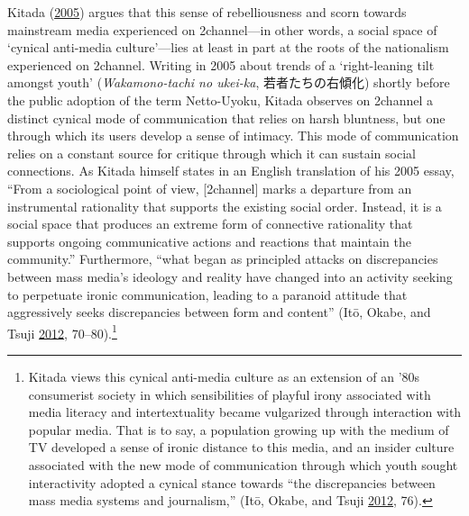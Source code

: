 \documentclass[10pt,british,A4paper,twoside]{memoir}
\begin{document}
Kitada (\protect\hyperlink{ref-kitada_eng:_2005}{2005}) argues that this
sense of rebelliousness and scorn towards mainstream media experienced
on 2channel---in other words, a social space of `cynical anti-media
culture'---lies at least in part at the roots of the nationalism
experienced on 2channel. Writing in 2005 about trends of a
`right-leaning tilt amongst youth' (\emph{Wakamono-tachi no ukei-ka},
若者たちの右傾化) shortly before the public adoption of the term
Netto-Uyoku, Kitada observes on 2channel a distinct cynical mode of
communication that relies on harsh bluntness, but one through which its
users develop a sense of intimacy. This mode of communication relies on
a constant source for critique through which it can sustain social
connections. As Kitada himself states in an English translation of his
2005 essay, ``From a sociological point of view, {[}2channel{]} marks a
departure from an instrumental rationality that supports the existing
social order. Instead, it is a social space that produces an extreme
form of connective rationality that supports ongoing communicative
actions and reactions that maintain the community.'' Furthermore, ``what
began as principled attacks on discrepancies between mass media's
ideology and reality have changed into an activity seeking to perpetuate
ironic communication, leading to a paranoid attitude that aggressively
seeks discrepancies between form and content'' (Itō, Okabe, and Tsuji
\protect\hyperlink{ref-ito_fandom_2012}{2012}, 70--80).\footnote{Kitada
  views this cynical anti-media culture as an extension of an '80s
  consumerist society in which sensibilities of playful irony associated
  with media literacy and intertextuality became vulgarized through
  interaction with popular media. That is to say, a population growing
  up with the medium of TV developed a sense of ironic distance to this
  media, and an insider culture associated with the new mode of
  communication through which youth sought interactivity adopted a
  cynical stance towards ``the discrepancies between mass media systems
  and journalism,'' (Itō, Okabe, and Tsuji
  \protect\hyperlink{ref-ito_fandom_2012}{2012}, 76).}
\end{document}
